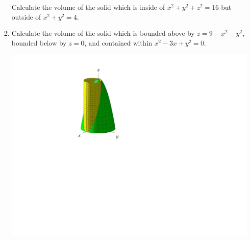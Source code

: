 \documentclass[12pt]{article}
\newif\ifans
\begin{document}
\begin{enumerate}
Calculate the volume of the solid which is inside of $x^2+y^2+z^2=16$ but outside of $x^2+y^2=4$.

\ifans{\fbox{$32\pi\sqrt{3}$; Detailed Solution: \textcolor{blue}{\href{http://www.math.drexel.edu/classes/Calculus/resources/Math200HW/Solutions/18_200_DI_Polar_10.pdf}{Here}}}} \fi

\newpage

\item Calculate the volume of the solid which is bounded above by $z=9-x^2-y^2$, bounded below by $z=0$, and contained within $x^2-3x+y^2=0$.

\begin{center}
\includegraphics[scale=0.7]{region2.pdf}
\end{center}

\ifans{\fbox{$\frac{405\pi}{32}$}} \fi

\end{enumerate}
\end{document}
